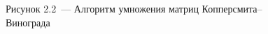 \documentclass[12pt, a4paper]{report}
\begin{document}
\begin{figure}[H]
\caption*{Рисунок 2.2~--- Алгоритм умножения матриц Копперсмита--Винограда}
\end{figure}
\end{document}

